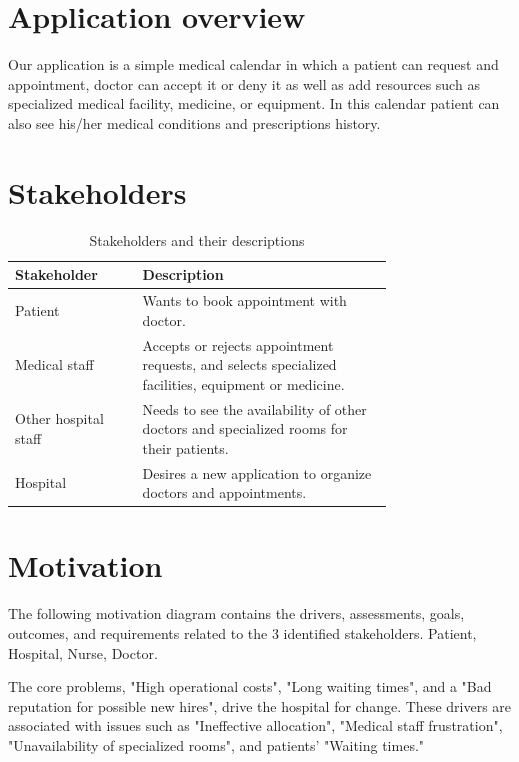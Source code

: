 \documentclass[11pt,english,a4paper,twoside]{article}
\title{\reporttitle}
\author{
        Lukáš Častven, Michal Kilian\\[2pt]
	{\small Slovenská technická univerzita v Bratislave}\\
	{\small Fakulta informatiky a informačných technológií}\\
	{\small \texttt{xcastven@stuba.sk, xkilian@stuba.sk}}
}
\date{\today}
\begin{document}
\maketitle

\section{Application overview}

Our application is a simple medical calendar in which a patient can request and appointment,
doctor can accept it or deny it as well as add resources such as specialized medical facility,
medicine, or equipment. In this calendar patient can also see his/her medical conditions and
prescriptions history.

\section{Stakeholders}

\begin{table}[h!]
  \centering
  \begin{tabular}{|p{0.25\linewidth}|p{0.5\linewidth}|}
    \hline
    \textbf{Stakeholder} & \textbf{Description} \\
    \hline
    Patient & Wants to book appointment with doctor. \\
    \hline
    Medical staff & Accepts or rejects appointment requests,
    and selects specialized facilities, equipment or medicine. \\
    \hline
    Other hospital staff & Needs to see the availability of
    other doctors and specialized rooms for their patients. \\
    \hline
    Hospital & Desires a new application to organize
    doctors and appointments. \\
    \hline
  \end{tabular}
  \caption{Stakeholders and their descriptions}
  \label{tab:stakeholders}
\end{table}

\section{Motivation}

The following motivation diagram contains the drivers, assessments, goals,
outcomes, and requirements related to the 3 identified stakeholders.
Patient, Hospital, Nurse, Doctor.

The core problems, "High operational costs", "Long waiting times", and a "Bad
reputation for possible new hires", drive the hospital for change. These drivers
are associated with issues such as "Ineffective allocation", "Medical
staff frustration", "Unavailability of specialized rooms",
and patients' "Waiting times."
\end{document}
